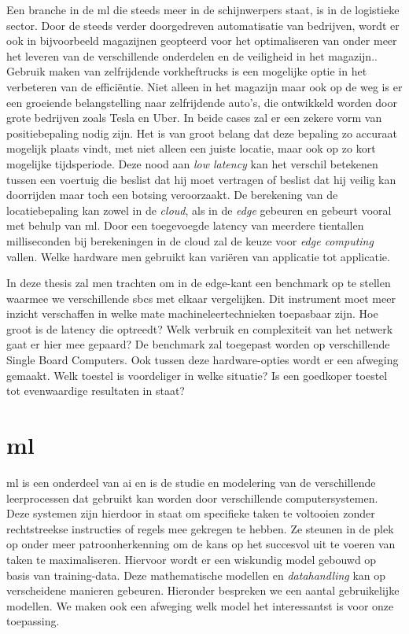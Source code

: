 Een branche in de \gls{ml} die steeds meer in de schijnwerpers staat, is in de logistieke sector\cite{barreto2017industry}. Door de steeds verder doorgedreven automatisatie van bedrijven, wordt er ook in bijvoorbeeld magazijnen geopteerd voor het optimaliseren van onder meer het leveren van de verschillende onderdelen en de veiligheid in het magazijn.. Gebruik maken van zelfrijdende vorkheftrucks is een mogelijke optie in het verbeteren van de effici\"entie. Niet alleen in het magazijn maar ook op de weg is er een groeiende belangstelling naar zelfrijdende auto's, die ontwikkeld worden door grote bedrijven zoals Tesla en Uber. In beide cases zal er een zekere vorm van positiebepaling nodig zijn. Het is van groot belang dat deze bepaling zo accuraat mogelijk plaats vindt, met niet alleen een juiste locatie, maar ook op zo kort mogelijke tijdsperiode. Deze nood aan \textit{low latency} kan het verschil betekenen tussen een voertuig die beslist dat hij moet vertragen of beslist dat hij veilig kan doorrijden maar toch een botsing veroorzaakt. De berekening van de locatiebepaling kan zowel in de \textit{cloud}, als in de \textit{edge}\cite{edgecomputingLi} gebeuren en gebeurt vooral met behulp van \gls{ml}. Door een toegevoegde latency van meerdere tientallen milliseconden bij berekeningen in de cloud zal de keuze voor \textit{edge computing} vallen. Welke hardware men gebruikt kan vari\"eren van applicatie tot applicatie.

In deze thesis zal men trachten om in de edge-kant een benchmark op te stellen waarmee we verschillende \gls{sbc}s met elkaar vergelijken. Dit instrument moet meer inzicht verschaffen in welke mate machineleertechnieken toepasbaar zijn. Hoe groot is de latency die optreedt? Welk verbruik en complexiteit van het netwerk gaat er hier mee gepaard? De benchmark zal toegepast worden op verschillende Single Board Computers. Ook tussen deze hardware-opties wordt er een afweging gemaakt. Welk toestel is voordeliger in welke situatie? Is een goedkoper toestel tot evenwaardige resultaten in staat?




\newpage

\section{\gls{ml}}
\gls{ml} is een onderdeel van \gls{ai} en is de studie en modelering van de verschillende leerprocessen dat gebruikt kan worden door verschillende computersystemen\cite{carbonell1983overview}. Deze systemen zijn hierdoor in staat om specifieke taken te voltooien zonder rechtstreekse instructies of regels mee gekregen te hebben. Ze steunen in de plek op onder meer patroonherkenning om de kans op het succesvol uit te voeren van taken te maximaliseren. Hiervoor wordt er een wiskundig model gebouwd op basis van training-data. Deze mathematische modellen en \textit{datahandling} kan op verscheidene manieren gebeuren. Hieronder bespreken we een aantal gebruikelijke modellen. We maken ook een afweging welk model het interessantst is voor onze toepassing. 

